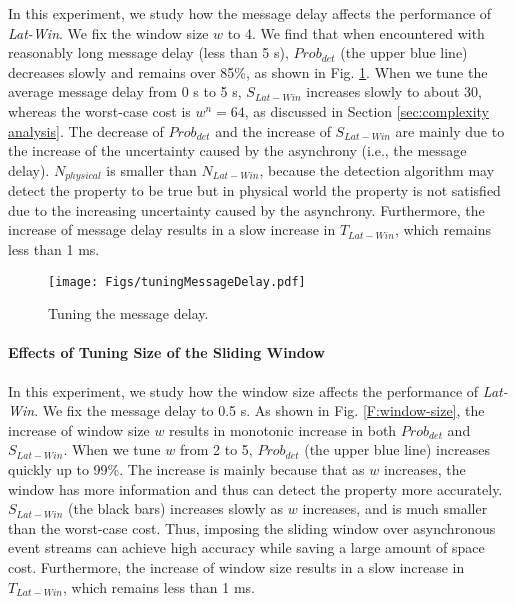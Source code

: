 \documentclass[12pt,journal,letterpaper,compsoc]{IEEEtran}
\begin{document}
In this experiment, we study how the message delay affects the performance of {\it Lat-Win}. We fix the window size $w$ to 4. We find that when encountered with reasonably long message delay (less than 5 s), $Prob_{det}$ (the upper blue line) decreases slowly and remains over 85\%, as shown in Fig. \ref{F:message-delay}. When we tune the average message delay from 0 s to 5 s, $S_{Lat-Win}$ increases slowly to about 30, whereas the worst-case cost is $w^{n} = 64$, as discussed in Section \ref{sec:complexity analysis}. The decrease of $Prob_{det}$ and the increase of $S_{Lat-Win}$ are mainly due to the increase of the uncertainty caused by the asynchrony (i.e., the message delay). $N_{physical}$ is smaller than $N_{Lat-Win}$, because the detection algorithm may detect the property to be true but in physical world the property is not satisfied due to the increasing uncertainty caused by the asynchrony. Furthermore, the increase of message delay results in a slow increase in $T_{Lat-Win}$, which remains less than 1 ms.

\begin{figure}[htbp]
\begin{center}
  \texttt{[image: Figs/tuningMessageDelay.pdf]}\\
  \centering\parbox[c]{2.5in}{\caption{Tuning the message delay.}}
  \label{F:message-delay}
\end{center}
\end{figure}

\paragraph{Effects of Tuning Size of the Sliding Window}

In this experiment, we study how the window size affects the performance of {\it Lat-Win}. We fix the message delay to 0.5 s. As shown in Fig. \ref{F:window-size}, the increase of window size $w$ results in monotonic increase in both $Prob_{det}$ and $S_{Lat-Win}$. When we tune $w$ from 2 to 5, $Prob_{det}$ (the upper blue line) increases quickly up to 99\%. The increase is mainly because that as $w$ increases, the window has more information and thus can detect the property more accurately. $S_{Lat-Win}$ (the black bars) increases slowly as $w$ increases, and is much smaller than the worst-case cost. Thus, imposing the sliding window over asynchronous event streams can achieve high accuracy while saving a large amount of space cost. Furthermore, the increase of window size results in a slow increase in $T_{Lat-Win}$, which remains less than 1 ms.
\end{document}
